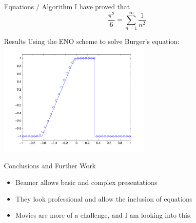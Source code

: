 \documentclass[xcolor=table]{beamer}
\numberwithin{equation}{section}
\begin{document}
\begin{frame}{Equations / Algorithm}
I have proved that
\begin{equation*}
\frac{\pi^2}{6} = \sum_{n=1}^\infty \frac{1}{n^2}
\end{equation*}
\end{frame}

\begin{frame}{Results}
Using the ENO scheme to solve Burger's equation:
\includegraphics[width=3in]{ENOTest5.pdf}
\end{frame}

\begin{frame}{Conclusions and Further Work}
\begin{itemize}
\item Beamer allows basic and complex presentations
\item They look professional and allow the inclusion of equations
\item Movies are more of a challenge, and I am looking into this.
\end{itemize}
\end{frame}
\end{document}
